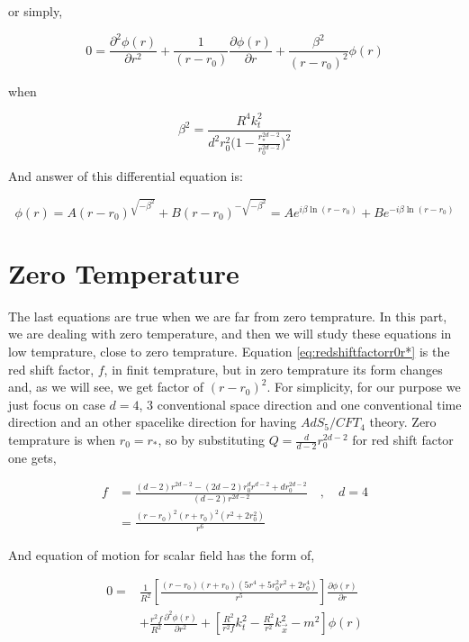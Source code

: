 or simply,

\begin{equation}
    0 = \frac{\partial^2 \phi(r)}{\partial r^2} + \frac{1}{(r-r_0)} \frac{\partial \phi(r)}{\partial r} + \frac{\beta^2}{(r-r_0)^2} \phi(r)
\end{equation}

when

\begin{equation}
    \beta^2 = \frac{R^4k^2_t}{d^2r_0^2\big(1-\frac{r^{2d-2}_*}{r^{2d-2}_0}\big)^2}
\end{equation}

And answer of this differential equation is:

\begin{equation} \label{eq:chargedblackholenearhorizonsolution}
    \phi(r) = A(r-r_0)^{ \sqrt{ - \beta^2}} + B(r-r_0)^{- \sqrt{-\beta^2}} = Ae^{ i\beta \ln{(r-r_0)}} + Be^{- i\beta\ln{(r-r_0)}} 
\end{equation}

\section{Zero Temperature}

The last equations are true when we are far from zero temprature. In this part, we are dealing with zero temperature, and then we will study these equations in low temprature, close to zero temprature. Equation \ref{eq:redshiftfactorr0r*} is the red shift factor, $f$, in finit temprature, but in zero temprature its form changes and, as we will see, we get factor of $(r-r_0)^2$. For simplicity, for our purpose we just focus on case $d = 4$, $3$ conventional space direction and one conventional time direction and an other spacelike direction for having $AdS_5/CFT_4$ theory. Zero temprature is when $r_0 = r_*$, so by substituting $Q = \frac{d}{d-2}r_0^{2d-2} $ for red shift factor one gets,

\begin{align} \label{eq:redshiftfactorr0r*zeroT}
    f &= \frac{(d-2)r^{2d-2} - (2d-2)r_0^{d}r^{d-2} + dr_0^{2d-2}}{(d-2)r^{2d-2}} \quad , \quad d = 4 \nonumber\\
      &= \frac{(r-r_0)^2(r+r_0)^2(r^2 + 2r_0^2)}{r^6}
\end{align}

And equation of motion for scalar field has the form of,

\begin{align} \label{eq:equationofmotionchargeblackholeinadsZetorT}
    0 =& \frac{1}{R^2}\left[\frac{(r-r_0)(r+r_0)(5r^4 + 5r_0^2r^2 + 2r_0^4)}{r^5}\right]\frac{\partial \phi(r)}{\partial r} \nonumber\\
      &+ \frac{r^2f}{R^2}\frac{\partial^2\phi(r)}{\partial r^2} + \left[ \frac{R^2}{r^2f}k^2_t-\frac{R^2}{r^2}k^2_{\vec{x}}-m^2\right]\phi(r)
\end{align} 


